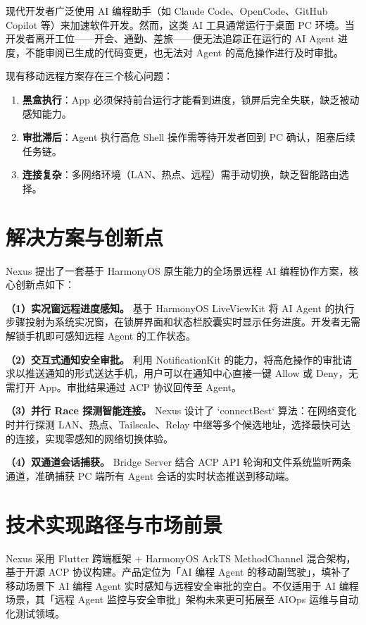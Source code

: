 \documentclass[12pt,a4paper,openany]{ctexbook}
\newcommand{\正文}{\wuhao}
\begin{document}
现代开发者广泛使用 AI 编程助手（如 Claude Code、OpenCode、GitHub Copilot 等）来加速软件开发。然而，这类 AI 工具通常运行于桌面 PC 环境。当开发者离开工位——开会、通勤、差旅——便无法追踪正在运行的 AI Agent 进度，不能审阅已生成的代码变更，也无法对 Agent 的高危操作进行及时审批。

现有移动远程方案存在三个核心问题：
\begin{enumerate}[itemsep=3pt]
  \item \textbf{黑盒执行}：App 必须保持前台运行才能看到进度，锁屏后完全失联，缺乏被动感知能力。
  \item \textbf{审批滞后}：Agent 执行高危 Shell 操作需等待开发者回到 PC 确认，阻塞后续任务链。
  \item \textbf{连接复杂}：多网络环境（LAN、热点、远程）需手动切换，缺乏智能路由选择。
\end{enumerate}

\section{解决方案与创新点}

Nexus 提出了一套基于 HarmonyOS 原生能力的全场景远程 AI 编程协作方案，核心创新点如下：

\textbf{（1）实况窗远程进度感知。} 基于 HarmonyOS LiveViewKit 将 AI Agent 的执行步骤投射为系统实况窗，在锁屏界面和状态栏胶囊实时显示任务进度。开发者无需解锁手机即可感知远程 Agent 的工作状态。

\textbf{（2）交互式通知安全审批。} 利用 NotificationKit 的能力，将高危操作的审批请求以推送通知的形式送达手机，用户可以在通知中心直接一键 Allow 或 Deny，无需打开 App。审批结果通过 ACP 协议回传至 Agent。

\textbf{（3）并行 Race 探测智能连接。} Nexus 设计了 `connectBest` 算法：在网络变化时并行探测 LAN、热点、Tailscale、Relay 中继等多个候选地址，选择最快可达的连接，实现零感知的网络切换体验。

\textbf{（4）双通道会话捕获。} Bridge Server 结合 ACP API 轮询和文件系统监听两条通道，准确捕获 PC 端所有 Agent 会话的实时状态推送到移动端。

\section{技术实现路径与市场前景}

Nexus 采用 Flutter 跨端框架 + HarmonyOS ArkTS MethodChannel 混合架构，基于开源 ACP 协议构建。产品定位为「AI 编程 Agent 的移动副驾驶」，填补了移动场景下 AI 编程 Agent 实时感知与远程安全审批的空白。不仅适用于 AI 编程场景，其「远程 Agent 监控与安全审批」架构未来更可拓展至 AIOps 运维与自动化测试领域。
\end{document}
